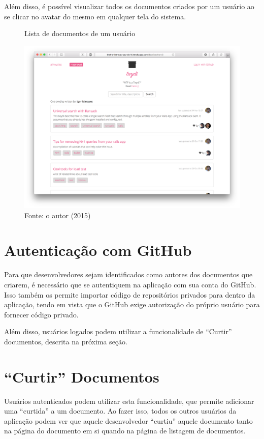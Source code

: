 Além disso, é possível visualizar todos os documentos criados por um usuário ao se clicar no avatar do mesmo em qualquer tela do sistema.

\begin{figure}[h]
	\centering
    \caption{Lista de documentos de um usuário}
    \includegraphics[width=15cm]{Imagens/print-by-user.png}
	\caption*{Fonte: o autor (2015)}
\end{figure}

\section{Autenticação com GitHub}

Para que desenvolvedores sejam identificados como autores dos documentos que criarem, é necessário que se autentiquem na aplicação com sua conta do GitHub. Isso também os permite importar código de repositórios privados para dentro da aplicação, tendo em vista que o GitHub exige autorização do próprio usuário para fornecer código privado.

Além disso, usuários logados podem utilizar a funcionalidade de ``Curtir'' documentos, descrita na próxima seção.

\section{``Curtir'' Documentos}

Usuários autenticados podem utilizar esta funcionalidade, que permite adicionar uma ``curtida'' a um documento. Ao fazer isso, todos os outros usuários da aplicação podem ver que aquele desenvolvedor ``curtiu'' aquele documento tanto na página do documento em si quando na página de listagem de documentos.

